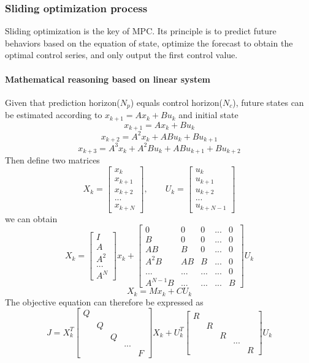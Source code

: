 \documentclass{article}
\begin{document}
\subsubsection{Sliding optimization process}
Sliding optimization is the key of MPC. Its principle is to predict future behaviors based on the equation of state, optimize the forecast to obtain the optimal control series, and only output the first control value. 
\paragraph{Mathematical reasoning based on linear system}Given that prediction horizon($N_p$) equals control horizon($N_c$), future states can be estimated according to $x_{k+1} = Ax_k +B u_k$ and initial state
\[x_{k+1} = Ax_k+Bu_k\]
\[x_{k+2}=A^2x_k+ABu_k+Bu_{k+1}\]
\[x_{k+3} = A^3x_k+A^2Bu_k+ABu_{k+1}+Bu_{k+2}\]
Then define two matrices
\[
X_k = \begin{bmatrix}
x_k\\
x_{k+1}\\
x_{k+2}\\
...\\
x_{k+N}
\end{bmatrix}
, \qquad U_k = \begin{bmatrix}
u_k\\
u_{k+1}\\
u_{k+2}\\
...\\
u_{k+N-1}
\end{bmatrix}
\]
we can obtain 
\[
X_k = \begin{bmatrix}
I\\
A\\
A^2\\
...\\
A^N
\end{bmatrix}x_k
+ \begin{bmatrix}
0&0&0&...&0\\
B&0&0&...&0\\
AB&B&0&...&0\\
A^2B&AB&B&...&0\\
...&...&...&...&0\\
A^{N-1}B &...&...&...&B
\end{bmatrix}U_k
\]
\[X_k = Mx_k +CU_k\]
The objective equation can therefore be expressed as
\[
J = X_k^T\begin{bmatrix}
Q\\
&Q\\
&&Q\\
&&&...\\
&&&&F
\end{bmatrix}X_k+U_k^T\begin{bmatrix}
R\\
&R\\
&&R\\
&&&...\\
&&&&R
\end{bmatrix}U_k
\]
\end{document}
